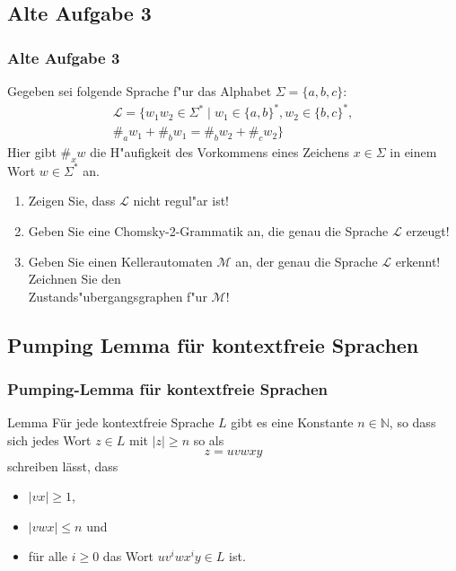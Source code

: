 \subsection{Alte Aufgabe 3}
\begin{frame}
	\frametitle{Alte Aufgabe 3}
	Gegeben sei folgende Sprache f"ur das Alphabet $\Sigma = \{a,b,c\}$:
	\begin{multline*}
		\mathcal{L} = \{w_1w_2 \in \Sigma^* \; | \; w_1 \in \{a,b\}^*,w_2 \in \{b,c\}^*,\\
		\#_a w_1 + \#_b w_1 = \#_b w_2 + \#_c w_2\}
	\end{multline*}
	Hier gibt $\#_x w$ die H"aufigkeit des Vorkommens eines Zeichens $x \in \Sigma$ in
	einem Wort $w \in \Sigma^*$ an.
	\begin{enumerate}
		\item Zeigen Sie, dass $\mathcal{L}$ nicht regul"ar ist!
		\item Geben Sie eine Chomsky-2-Grammatik an, die genau die Sprache $\mathcal{L}$
		erzeugt!
		\item Geben Sie einen Kellerautomaten $\mathcal{M}$ an, der genau die Sprache
		$\mathcal{L}$ erkennt! Zeichnen Sie den\\
		Zustands"ubergangsgraphen f"ur $\mathcal{M}$!
	\end{enumerate}
\end{frame}

\subsection{Pumping Lemma für kontextfreie Sprachen}
\begin{frame}
	\frametitle{Pumping-Lemma für kontextfreie Sprachen}
	\begin{exampleblock}{Lemma}
		Für jede kontextfreie Sprache $L$ gibt es eine Konstante $n \in \mathbb{N}$,
		so dass sich jedes Wort $z \in L$ mit $|z| \geq n$ so als
		$$ z = uvwxy $$
		schreiben lässt, dass
		\begin{itemize}
			\item $|vx| \geq 1$,
			\item $|vwx| \leq n$ und
			\item für alle $i \geq 0$ das Wort $uv^iwx^iy \in L$ ist.
		\end{itemize}
	\end{exampleblock}
\end{frame}

